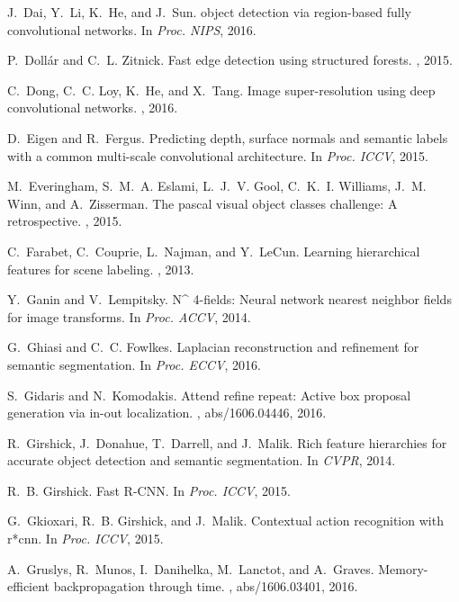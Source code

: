 \documentclass[10pt,twocolumn,letterpaper]{article}
\begin{document}
\begin{thebibliography}{100}
	J.~Dai, Y.~Li, K.~He, and J.~Sun.
	 object detection via region-based fully convolutional
	networks.
	\newblock In {\em Proc. {NIPS}}, 2016.
	
	P.~Doll{\'{a}}r and C.~L. Zitnick.
	\newblock Fast edge detection using structured forests.
	, 2015.
	
	C.~Dong, C.~C. Loy, K.~He, and X.~Tang.
	\newblock Image super-resolution using deep convolutional networks.
	, 2016.
	
	D.~Eigen and R.~Fergus.
	\newblock Predicting depth, surface normals and semantic labels with a common
	multi-scale convolutional architecture.
	\newblock In {\em Proc. {ICCV}}, 2015.
	
	M.~Everingham, S.~M.~A. Eslami, L.~J.~V. Gool, C.~K.~I. Williams, J.~M. Winn,
	and A.~Zisserman.
	\newblock The pascal visual object classes challenge: {A} retrospective.
	, 2015.
	
	C.~Farabet, C.~Couprie, L.~Najman, and Y.~LeCun.
	\newblock Learning hierarchical features for scene labeling.
	, 2013.
	
	Y.~Ganin and V.~Lempitsky.
	\newblock N\^{} 4-fields: Neural network nearest neighbor fields for image
	transforms.
	\newblock In {\em Proc. {ACCV}}, 2014.
	
	G.~Ghiasi and C.~C. Fowlkes.
	\newblock Laplacian reconstruction and refinement for semantic segmentation.
	\newblock In {\em Proc. {ECCV}}, 2016.
	
	S.~Gidaris and N.~Komodakis.
	\newblock Attend refine repeat: Active box proposal generation via in-out
	localization.
	, abs/1606.04446, 2016.
	
	R.~Girshick, J.~Donahue, T.~Darrell, and J.~Malik.
	\newblock Rich feature hierarchies for accurate object detection and semantic
	segmentation.
	\newblock In {\em CVPR}, 2014.
	
	R.~B. Girshick.
	\newblock Fast {R-CNN}.
	\newblock In {\em Proc. {ICCV}}, 2015.
	
	G.~Gkioxari, R.~B. Girshick, and J.~Malik.
	\newblock Contextual action recognition with r*cnn.
	\newblock In {\em Proc. {ICCV}}, 2015.
	
	A.~Gruslys, R.~Munos, I.~Danihelka, M.~Lanctot, and A.~Graves.
	\newblock Memory-efficient backpropagation through time.
	, abs/1606.03401, 2016.
	

\end{thebibliography}
\end{document}
